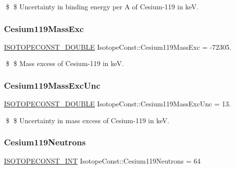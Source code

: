 \$ \$ Uncertainty in binding energy per A of Cesium-\/119 in keV. \mbox{\label{group___isotope_const-_cesium-_cs119_ga34ccc67be7c29803c69192d218203caa}} 
\subsubsection{\texorpdfstring{Cesium119\+Mass\+Exc}{Cesium119MassExc}}
{\footnotesize\ttfamily \mbox{\hyperlink{group___isotope_const-_macros_ga8f45a7272ce02c0b4c65c44636ed719a}{I\+S\+O\+T\+O\+P\+E\+C\+O\+N\+S\+T\+\_\+\+D\+O\+U\+B\+LE}} Isotope\+Const\+::\+Cesium119\+Mass\+Exc = -\/72305.}

\$ \$ Mass excess of Cesium-\/119 in keV. \mbox{\label{group___isotope_const-_cesium-_cs119_ga27ffd6159245a06fc3e80d9772491071}} 
\subsubsection{\texorpdfstring{Cesium119\+Mass\+Exc\+Unc}{Cesium119MassExcUnc}}
{\footnotesize\ttfamily \mbox{\hyperlink{group___isotope_const-_macros_ga8f45a7272ce02c0b4c65c44636ed719a}{I\+S\+O\+T\+O\+P\+E\+C\+O\+N\+S\+T\+\_\+\+D\+O\+U\+B\+LE}} Isotope\+Const\+::\+Cesium119\+Mass\+Exc\+Unc = 13.}

\$ \$ Uncertainty in mass excess of Cesium-\/119 in keV. \mbox{\label{group___isotope_const-_cesium-_cs119_ga4315178f4f5034908bdc4c6eabccac40}} 
\subsubsection{\texorpdfstring{Cesium119\+Neutrons}{Cesium119Neutrons}}
{\footnotesize\ttfamily \mbox{\hyperlink{group___isotope_const-_macros_ga5f18360b3e99483a35c32d789e62621c}{I\+S\+O\+T\+O\+P\+E\+C\+O\+N\+S\+T\+\_\+\+I\+NT}} Isotope\+Const\+::\+Cesium119\+Neutrons = 64}

